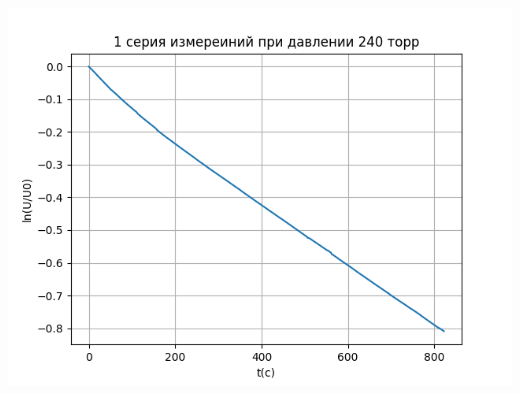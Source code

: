 \
\\
\begin{minipage}{\textwidth}
  \includegraphics[width=1\linewidth]{pic/240_1.png}
\end{minipage}



